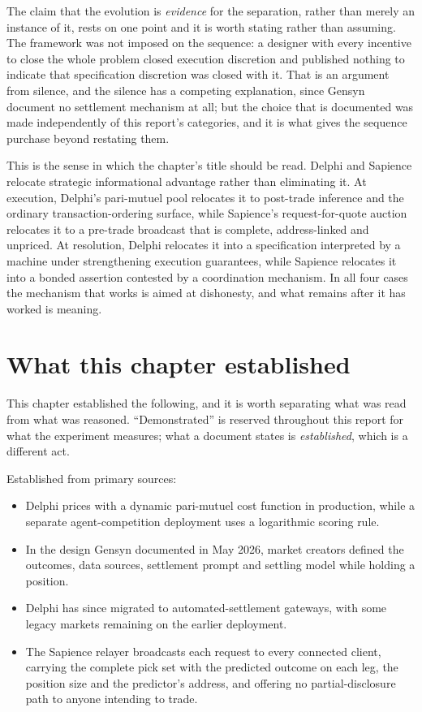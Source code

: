 The claim that the evolution is \emph{evidence} for the separation, rather than merely an
instance of it, rests on one point and it is worth stating rather than assuming. The
framework was not imposed on the sequence: a designer with every incentive to close the
whole problem closed execution discretion and published nothing to indicate that
specification discretion was closed with it. That is an argument from silence, and the
silence has a competing explanation, since Gensyn document no settlement mechanism at all;
but the choice that is documented was made independently of this report's categories, and
it is what gives the sequence purchase beyond restating them.

This is the sense in which the chapter's title should be read. Delphi and Sapience relocate
strategic informational advantage rather than eliminating it. At execution, Delphi's
pari-mutuel pool relocates it to post-trade inference and the ordinary transaction-ordering
surface, while Sapience's request-for-quote auction relocates it to a pre-trade broadcast
that is complete, address-linked and unpriced. At resolution, Delphi relocates it into a
specification interpreted by a machine under strengthening execution guarantees, while
Sapience relocates it into a bonded assertion contested by a coordination mechanism. In all
four cases the mechanism that works is aimed at dishonesty, and what remains after it has
worked is meaning.

\section{What this chapter established}

This chapter established the following, and it is worth separating what was read from what
was reasoned. ``Demonstrated'' is reserved throughout this report for what the experiment
measures; what a document states is \emph{established}, which is a different act.

Established from primary sources:

\begin{itemize}
  \item Delphi prices with a dynamic pari-mutuel cost function in production, while a
    separate agent-competition deployment uses a logarithmic scoring rule.
  \item In the design Gensyn documented in May 2026, market creators defined the outcomes,
    data sources, settlement prompt and settling model while holding a position.
  \item Delphi has since migrated to automated-settlement gateways, with some legacy markets
    remaining on the earlier deployment.
  \item The Sapience relayer broadcasts each request to every connected client, carrying the
    complete pick set with the predicted outcome on each leg, the position size and the
    predictor's address, and offering no partial-disclosure path to anyone intending to trade.
\end{itemize}

